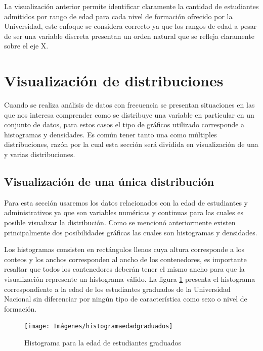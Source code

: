 \documentclass[
]{book}
\begin{document}
La visualización anterior permite identificar claramente la cantidad de estudiantes admitidos por rango de edad para cada nivel de formación ofrecido por la Universidad, este enfoque se considera correcto ya que los rangos de edad a pesar de ser una variable discreta presentan un orden natural que se refleja claramente sobre el eje X.

\hypertarget{visualizaciuxf3n-de-distribuciones}{%
\section{Visualización de distribuciones}\label{visualizaciuxf3n-de-distribuciones}}

Cuando se realiza análisis de datos con frecuencia se presentan situaciones en las que nos interesa comprender como se distribuye una variable en particular en un conjunto de datos, para estos casos el tipo de gráficos utilizado corresponde a histogramas y densidades. Es común tener tanto una como múltiples distribuciones, razón por la cual esta sección será dividida en visualización de una y varias distribuciones.

\hypertarget{visualizaciuxf3n-de-una-uxfanica-distribuciuxf3n}{%
\subsection{Visualización de una única distribución}\label{visualizaciuxf3n-de-una-uxfanica-distribuciuxf3n}}

Para esta sección usaremos los datos relacionados con la edad de estudiantes y administrativos ya que son variables numéricas y continuas para las cuales es posible visualizar la distribución. Como se mencionó anteriormente existen principalmente dos posibilidades gráficas las cuales son histogramas y densidades.

Los histogramas consisten en rectángulos llenos cuya altura corresponde a los conteos y los anchos corresponden al ancho de los contenedores, es importante resaltar que todos los contenedores deberán tener el mismo ancho para que la visualización represente un histograma válido. La figura \ref{fig:histogramaedadgraduados-fig} presenta el histograma correspondiente a la edad de los estudiantes graduados de la Universidad Nacional sin diferenciar por ningún tipo de característica como sexo o nivel de formación.

\begin{figure}

{\centering \texttt{[image: Imágenes/histogramaedadgraduados]} 

}

\caption{Histograma para la edad de estudiantes graduados}\label{fig:histogramaedadgraduados-fig}
\end{figure}
\end{document}
